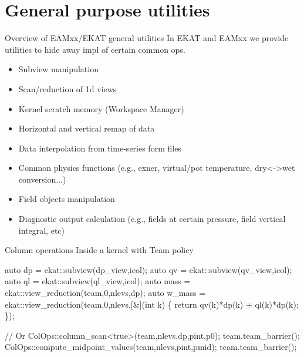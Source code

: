 \documentclass[8pt,NM,theme=angles,number=2023-00000]{sandia-beamer}
\begin{document}
\section{General purpose utilities}
\begin{frame}{Overview of EAMxx/EKAT general utilities}
  In EKAT and EAMxx we provide utilities to hide away impl of certain common ops.
  \begin{itemize}
    \item Subview manipulation
    \item Scan/reduction of 1d views
    \item Kernel scratch memory (Workspace Manager)
    \item Horizontal and vertical remap of data
    \item Data interpolation from time-series form files
    \item Common physics functions (e.g., exner, virtual/pot temperature, dry<->wet conversion...)
    \item Field objects manipulation
    \item Diagnostic output calculation (e.g., fields at certain pressure, field vertical integral, etc)
  \end{itemize}
\end{frame}

\begin{frame}[fragile]{Column operations}
  Inside a kernel with Team policy
  \begin{semiverbatim} \small
      auto dp = ekat::subview(dp\_view,icol);
      auto qv = ekat::subview(qv\_view,icol);
      auto ql = ekat::subview(ql\_view,icol);
      auto mass = ekat::view\_reduction(team,0,nlevs,dp);
      auto w\_mass = ekat::view\_reduction(team,0,nlevs,[&](int k) \{
        return qv(k)*dp(k) + ql(k)*dp(k);
      \});

      // Or
      ColOps::column\_scan<true>(team,nlevs,dp,pint,p0);
      team.team\_barrier();
      ColOps::compute\_midpoint\_values(team,nlevs,pint,pmid);
      team.team\_barrier();
  \end{semiverbatim}
\end{frame}
\end{document}
